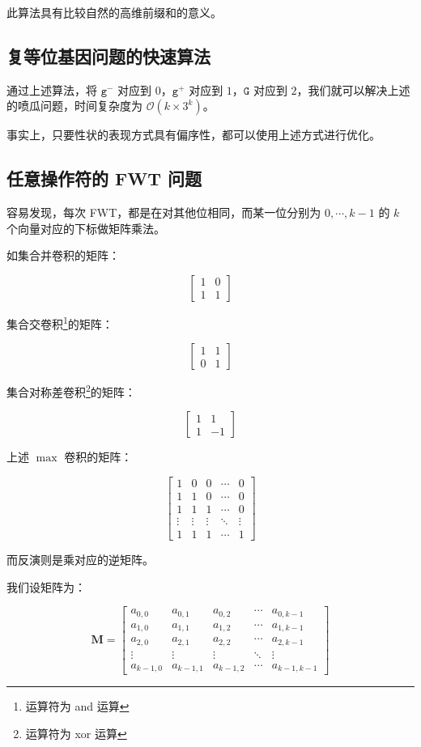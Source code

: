 \documentclass[12pt]{article} %
\begin{document}
此算法具有比较自然的高维前缀和的意义。

\subsection{复等位基因问题的快速算法}

通过上述算法，将 $\texttt{g}^-$ 对应到 $0$，$\texttt{g}^+$ 对应到 $1$，$\texttt{G}$ 对应到 $2$，我们就可以解决上述的喷瓜问题，时间复杂度为 $\mathcal O(k \times 3^k)$。

事实上，只要性状的表现方式具有偏序性，都可以使用上述方式进行优化。

\subsection{任意操作符的 FWT 问题}

容易发现，每次 FWT，都是在对其他位相同，而某一位分别为 $0, \cdots ,k-1$ 的 $k$ 个向量对应的下标做矩阵乘法。

如集合并卷积的矩阵：

$$\begin{bmatrix} 1 & 0 \\ 1 & 1 \end{bmatrix}$$

集合交卷积\footnote{运算符为 and 运算}的矩阵：

$$\begin{bmatrix} 1 & 1 \\ 0 & 1 \end{bmatrix}$$

集合对称差卷积\footnote{运算符为 xor 运算}的矩阵：

$$\begin{bmatrix} 1 & 1 \\ 1 & -1 \end{bmatrix}$$

上述 $\max$ 卷积的矩阵：

$$\begin{bmatrix} 1& 0 & 0& \cdots & 0\\ 1& 1& 0& \cdots & 0\\ 1& 1 & 1& \cdots & 0\\ \vdots& \vdots& \vdots& \ddots& \vdots\\ 1& 1& 1 & \cdots & 1 \end{bmatrix}$$

而反演则是乘对应的逆矩阵。

我们设矩阵为：

$$\mathbf{M}=\begin{bmatrix} a_{0,0}&  a_{0,1} &  a_{0,2}& \cdots &  a_{0,k-1}\\  a_{1,0}&  a_{1,1}&  a_{1,2}& \cdots &  a_{1,k-1}\\  a_{2,0}&  a_{2,1} &  a_{2,2}& \cdots &  a_{2,k-1}\\ \vdots& \vdots& \vdots& \ddots& \vdots\\  a_{k-1,0}&  a_{k-1,1}&  a_{k-1,2} & \cdots &  a_{k-1,k-1} \end{bmatrix}$$
\end{document}
